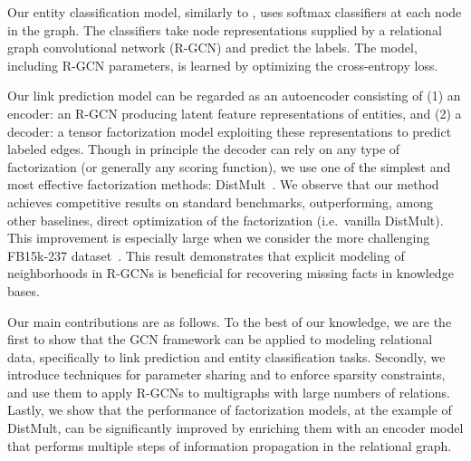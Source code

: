 Our entity classification model, similarly to \citet{kipf2016semi}, uses softmax classifiers at each node in the graph. The classifiers take node representations supplied by a relational graph convolutional network (R-GCN) and predict the labels. The model, including R-GCN parameters, is learned by optimizing the cross-entropy loss.

Our link prediction model can be regarded as an autoencoder consisting of (1) an encoder: an R-GCN producing latent feature representations of entities, and (2) a decoder: a tensor factorization model exploiting these representations to predict labeled edges. Though in principle the decoder can rely on any type of factorization (or generally any scoring function), we use one of the simplest and most effective factorization methods: DistMult~\cite{distmult-embedding_entities_and_relations}. We observe that our method achieves competitive results on standard benchmarks, outperforming, among other baselines, direct optimization of the factorization (i.e.~vanilla DistMult).  This improvement is especially large when we consider the more challenging FB15k-237 dataset~\cite{toutanova2015observed}. This result demonstrates that explicit modeling of neighborhoods in R-GCNs is beneficial for recovering missing facts in knowledge bases.

Our main contributions are as follows. To the best of our knowledge, we are the first to show that the GCN framework can be applied to modeling relational data, specifically to link prediction and entity classification tasks. Secondly, we introduce techniques for parameter sharing and to enforce sparsity constraints, and use them to apply R-GCNs to multigraphs with large numbers of relations. Lastly, we show that the performance of factorization models, at the example of DistMult, can be significantly improved by enriching them with an encoder model that performs multiple steps of information propagation in the relational graph.
